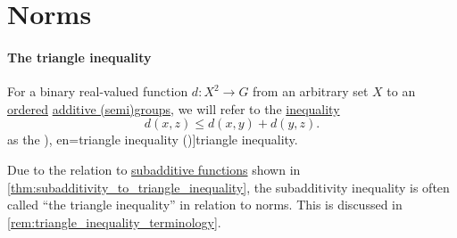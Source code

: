 \section{Norms}\label{sec:norms}

\paragraph{The triangle inequality}

\begin{definition}\label{def:triangle_inequality}\mimprovised
  For a binary real-valued function \( d: X^2 \to G \) from an arbitrary set \( X \) to an \hyperref[def:ordered_semigroup]{ordered} \hyperref[def:additive_semigroup]{additive (semi)groups}, we will refer to the \hyperref[def:inequality]{inequality}
  \begin{equation}\label{eq:def:triangle_inequality}
    d(x, z) \leq d(x, y) + d(y, z).
  \end{equation}
  as the \term[ru=неравенство треугольника (\cite[161]{Арнольд2014ОДУ}), en=triangle inequality (\cite[\S 1.4]{Rudin1987RealAndComplexAnalysis})]{triangle inequality}.
\end{definition}
\begin{comments}
  \item Due to the relation to \hyperref[def:additive_function/sub]{subadditive functions} shown in \cref{thm:subadditivity_to_triangle_inequality}, the subadditivity inequality is often called \enquote{the triangle inequality} in relation to norms. This is discussed in \cref{rem:triangle_inequality_terminology}.
\end{comments}

